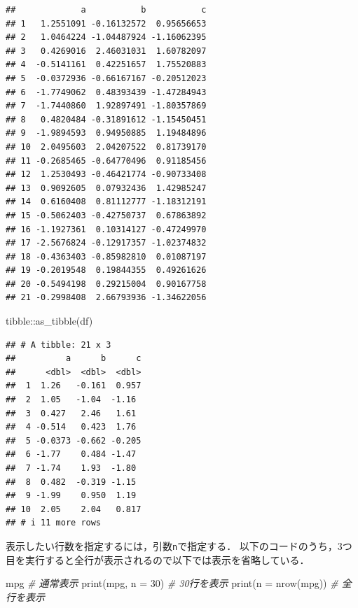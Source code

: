 \documentclass[
]{article}
\newenvironment{Shaded}{\begin{snugshade}}{\end{snugshade}}
\newcommand{\AttributeTok}[1]{\textcolor[rgb]{0.77,0.63,0.00}{#1}}
\newcommand{\CommentTok}[1]{\textcolor[rgb]{0.56,0.35,0.01}{\textit{#1}}}
\newcommand{\DecValTok}[1]{\textcolor[rgb]{0.00,0.00,0.81}{#1}}
\newcommand{\FunctionTok}[1]{\textcolor[rgb]{0.00,0.00,0.00}{#1}}
\newcommand{\NormalTok}[1]{#1}
\newcommand{\SpecialCharTok}[1]{\textcolor[rgb]{0.00,0.00,0.00}{#1}}
\begin{document}
\begin{verbatim}
##             a           b           c
## 1   1.2551091 -0.16132572  0.95656653
## 2   1.0464224 -1.04487924 -1.16062395
## 3   0.4269016  2.46031031  1.60782097
## 4  -0.5141161  0.42251657  1.75520883
## 5  -0.0372936 -0.66167167 -0.20512023
## 6  -1.7749062  0.48393439 -1.47284943
## 7  -1.7440860  1.92897491 -1.80357869
## 8   0.4820484 -0.31891612 -1.15450451
## 9  -1.9894593  0.94950885  1.19484896
## 10  2.0495603  2.04207522  0.81739170
## 11 -0.2685465 -0.64770496  0.91185456
## 12  1.2530493 -0.46421774 -0.90733408
## 13  0.9092605  0.07932436  1.42985247
## 14  0.6160408  0.81112777 -1.18312191
## 15 -0.5062403 -0.42750737  0.67863892
## 16 -1.1927361  0.10314127 -0.47249970
## 17 -2.5676824 -0.12917357 -1.02374832
## 18 -0.4363403 -0.85982810  0.01087197
## 19 -0.2019548  0.19844355  0.49261626
## 20 -0.5494198  0.29215004  0.90167758
## 21 -0.2998408  2.66793936 -1.34622056
\end{verbatim}

\begin{Shaded}
\begin{Highlighting}[]
\NormalTok{tibble}\SpecialCharTok{::}\FunctionTok{as\_tibble}\NormalTok{(df)}
\end{Highlighting}
\end{Shaded}

\begin{verbatim}
## # A tibble: 21 x 3
##          a      b      c
##      <dbl>  <dbl>  <dbl>
##  1  1.26   -0.161  0.957
##  2  1.05   -1.04  -1.16 
##  3  0.427   2.46   1.61 
##  4 -0.514   0.423  1.76 
##  5 -0.0373 -0.662 -0.205
##  6 -1.77    0.484 -1.47 
##  7 -1.74    1.93  -1.80 
##  8  0.482  -0.319 -1.15 
##  9 -1.99    0.950  1.19 
## 10  2.05    2.04   0.817
## # i 11 more rows
\end{verbatim}

表示したい行数を指定するには，引数\texttt{n}で指定する．
以下のコードのうち，3つ目を実行すると全行が表示されるので以下では表示を省略している．

\begin{Shaded}
\begin{Highlighting}[]
\NormalTok{mpg                  }\CommentTok{\# 通常表示}
\FunctionTok{print}\NormalTok{(mpg, }\AttributeTok{n =} \DecValTok{30}\NormalTok{)   }\CommentTok{\# 30行を表示}
\FunctionTok{print}\NormalTok{(}\AttributeTok{n =} \FunctionTok{nrow}\NormalTok{(mpg)) }\CommentTok{\# 全行を表示}
\end{Highlighting}
\end{Shaded}
\end{document}
